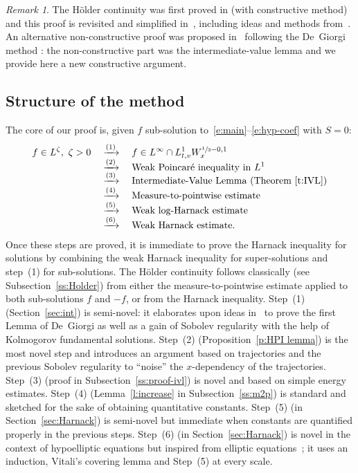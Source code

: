 \documentclass[JEP,XML,SOM,Unicode,NoFloatCountersInSection,published]{cedram}
\theoremstyle{definition}
\theoremstyle{remark}
\newtheorem{remark}[theorem]{Remark}
\begin{document}
\begin{remark}
The Hölder continuity was first proved in \cite{wz09,wz11}
(with constructive method) and this proof is revisited and
simplified in~\cite{Guerand-Imbert}, including ideas and
methods from~\cite{moser,kru63,kru64}. An alternative
non-constructive proof was proposed in~\cite{gimv} following
the De~Giorgi method \cite{DG56}: the non-constructive part was
the intermediate-value lemma and we provide here a new
constructive argument.
\end{remark}

\subsection{Structure of the method}

The core of our proof is, given $f$ sub-solution
to~\eqref{e:main}--\eqref{e:hyp-coef} with $S=0$:\vspace*{-5pt}\enlargethispage{.5\baselineskip}%
\begin{align*}
f \in L^\zeta, \ \zeta >0
& \quad \xrightarrow{(1)}
\quad f \in L^\infty \cap L^1_{t,v}W^{\sfrac13-0,1}_x \\[-5pt]
& \quad \xrightarrow{(2)} \quad
\text{Weak Poincaré inequality in $L^1$} \\[-5pt]
& \quad \xrightarrow{(3)}
\quad \text{Intermediate-Value Lemma (Theorem~\ref{t:IVL}})\\[-5pt]
& \quad \xrightarrow{(4)}
\quad \text{Measure-to-pointwise estimate} \\[-5pt]
& \quad \xrightarrow{(5)} \quad \text{Weak log-Harnack
estimate} \\[-5pt]
& \quad \xrightarrow{(6)}
\quad \text{Weak Harnack estimate.}
\end{align*}
Once these steps are proved, it is immediate to prove the Harnack
inequality for solutions by combining the weak Harnack inequality
for super-solutions and step~(1) for sub-solutions. The Hölder
continuity follows classically (see Subsection~\ref{ss:Holder})
from either the measure-to-pointwise estimate applied to both
sub-solutions $f$ and $-f$, or from the Harnack inequality.
Step~(1) (Section~\ref{sec:int}) is semi-novel: it elaborates
upon ideas in~\cite{pp} to prove the first Lemma of De~Giorgi as
well as a gain of Sobolev regularity with the help of Kolmogorov
fundamental solutions. Step~(2) (Proposition~\ref{p:HPI lemma})
is the most novel step and introduces an argument based on
trajectories and the previous Sobolev regularity to ``noise'' the
$x$-dependency of the trajectories. Step~(3) (proof in
Subsection~\ref{ss:proof-ivl}) is novel and based on simple
energy estimates. Step~(4) (Lemma~\ref{l:increase} in
Subsection~\ref{ss:m2p}) is standard and sketched for the sake of
obtaining quantitative constants. Step~(5) (in
Section~\ref{sec:Harnack}) is semi-novel but immediate when
constants are quantified properly in the previous steps. Step~(6)
(in Section~\ref{sec:Harnack}) is novel in the context of
hypoelliptic equations but inspired from elliptic
equations~\cite{MR3565366}; it uses an induction, Vitali's
covering lemma and Step~(5) at every scale.
\end{document}
